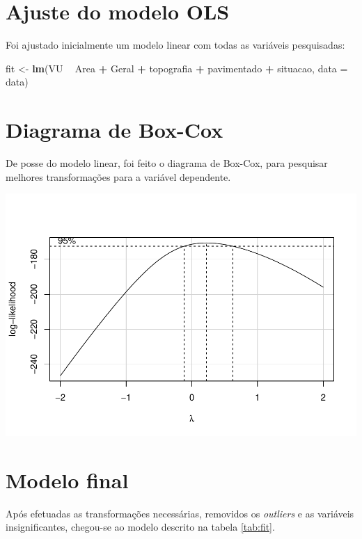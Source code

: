 \documentclass[]{article}
\newenvironment{Shaded}{\begin{snugshade}}{\end{snugshade}}
\newcommand{\KeywordTok}[1]{\textcolor[rgb]{0.13,0.29,0.53}{\textbf{#1}}}
\newcommand{\DataTypeTok}[1]{\textcolor[rgb]{0.13,0.29,0.53}{#1}}
\newcommand{\StringTok}[1]{\textcolor[rgb]{0.31,0.60,0.02}{#1}}
\newcommand{\OperatorTok}[1]{\textcolor[rgb]{0.81,0.36,0.00}{\textbf{#1}}}
\newcommand{\NormalTok}[1]{#1}
\begin{document}
\section{Ajuste do modelo OLS}\label{ajuste-do-modelo-ols}

Foi ajustado inicialmente um modelo linear com todas as variáveis
pesquisadas:

\begin{Shaded}
\begin{Highlighting}[]
\NormalTok{fit <-}\StringTok{ }\KeywordTok{lm}\NormalTok{(VU }\OperatorTok{~}\StringTok{ }\NormalTok{Area }\OperatorTok{+}\StringTok{ }\NormalTok{Geral }\OperatorTok{+}\StringTok{ }\NormalTok{topografia }\OperatorTok{+}\StringTok{ }\NormalTok{pavimentado }\OperatorTok{+}\StringTok{ }\NormalTok{situacao, }\DataTypeTok{data =}\NormalTok{ data)}
\end{Highlighting}
\end{Shaded}

\section{Diagrama de Box-Cox}\label{diagrama-de-box-cox}

De posse do modelo linear, foi feito o diagrama de Box-Cox, para
pesquisar melhores transformações para a variável dependente.

\begin{center}\includegraphics[width=0.7\linewidth]{Report_files/figure-latex/unnamed-chunk-5-1} \end{center}

\section{Modelo final}\label{modelo-final}

Após efetuadas as transformações necessárias, removidos os
\emph{outliers} e as variáveis insignificantes, chegou-se ao modelo
descrito na tabela \ref{tab:fit}.
\end{document}
